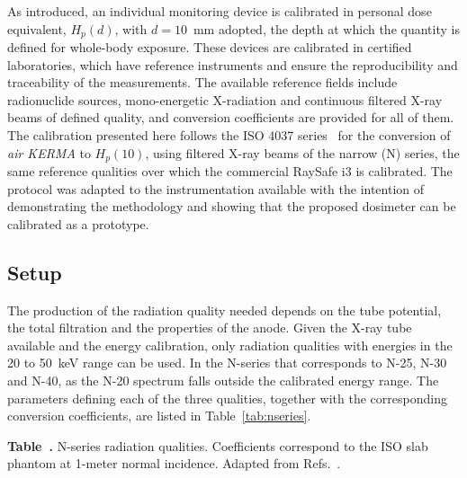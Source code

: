 As introduced, an individual monitoring device is calibrated in personal dose equivalent, $H_p(d)$, with $d = 10$~mm adopted, the depth at which the quantity is defined for whole-body exposure. These devices are calibrated in certified laboratories, which have reference instruments and ensure the reproducibility and traceability of the measurements. The available reference fields include radionuclide sources, mono-energetic X-radiation and continuous filtered X-ray beams of defined quality, and conversion coefficients are provided for all of them. The calibration presented here follows the ISO 4037 series~\cite{113,ISO2,ISO3} for the conversion of \emph{air KERMA} to $H_p(10)$, using filtered X-ray beams of the narrow (N) series, the same reference qualities over which the commercial RaySafe i3 is calibrated. The protocol was adapted to the instrumentation available with the intention of demonstrating the methodology and showing that the proposed dosimeter can be calibrated as a prototype.

\subsection{Setup}
The production of the radiation quality needed depends on the tube potential, the total filtration and the properties of the anode. Given the X-ray tube available and the energy calibration, only radiation qualities with energies in the 20 to 50~keV range can be used. In the N-series that corresponds to N-25, N-30 and N-40, as the N-20 spectrum falls outside the calibrated energy range. The parameters defining each of the three qualities, together with the corresponding conversion coefficients, are listed in Table~\ref{tab:nseries}.
\vspace{1em}

\label{tab:nseries}
\noindent\textbf{Table~\thetable.} N-series radiation qualities. Coefficients correspond to the ISO slab phantom at 1-meter normal incidence. Adapted from Refs.~\cite{113,ISO3}.%

\vspace{0.1em}

